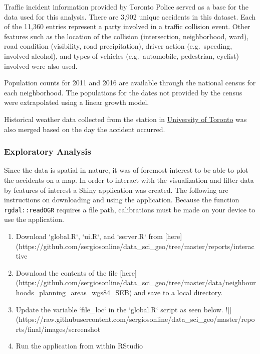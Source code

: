 \documentclass[]{article}
\begin{document}
Traffic incident information provided by Toronto Police served as a base
for the data used for this analysis. There are 3,902 unique accidents in
this dataset. Each of the 11,360 entries represent a party involved in a
traffic collision event. Other features such as the location of the
collision (intersection, neighborhood, ward), road condition
(visibility, road precipitation), driver action (e.g.~speeding, involved
alcohol), and types of vehicles (e.g.~automobile, pedestrian, cyclist)
involved were also used.

Population counts for 2011 and 2016 are available through the national
census for each neighborhood. The populations for the dates not provided
by the census were extrapolated using a linear growth model.

Historical weather data collected from the station in
\href{https://goo.gl/maps/g8KZF6SWUw82}{University of Toronto} was also
merged based on the day the accident occurred.

\subsubsection{Exploratory Analysis}\label{exploratory-analysis}

Since the data is spatial in nature, it was of foremost interest to be
able to plot the accidents on a map. In order to interact with the
visualization and filter data by features of interest a Shiny
application was created. The following are instructions on downloading
and using the application. Because the function \texttt{rgdal::readOGR}
requires a file path, calibrations must be made on your device to use
the application.

\begin{enumerate}
  \item Download `global.R`, `ui.R`, and `server.R` from [here](https://github.com/sergiosonline/data_sci_geo/tree/master/reports/interactive%
  \item Download the contents of the file [here](https://github.com/sergiosonline/data_sci_geo/tree/master/data/neighbourhoods_planning_areas_wgs84_SEB) and save to a local directory.
  \item Update the variable `file_loc` in the `global.R` script as seen below.
  ![](https://raw.githubusercontent.com/sergiosonline/data_sci_geo/master/reports/final/images/screenshot%
  \item Run the application from within RStudio
\end{enumerate}
\end{document}
